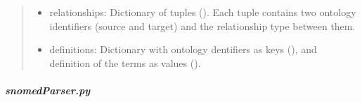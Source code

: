 \documentclass[letterpaper,10pt,english]{sphinxmanual}
\begin{document}
\begin{fulllineitems}
\begin{quote}
\begin{description}
\begin{itemize}
\item {} 
relationships: Dictionary of tuples (). Each tuple contains two ontology identifiers (source and target) and                         the relationship type between them.

\item {} 
definitions: Dictionary with ontology dentifiers as keys (), and definition of the terms as values ().

\end{itemize}


\end{description}\end{quote}

\end{fulllineitems}



\subparagraph{snomedParser.py}
\label{\detokenize{_autosummary/graphdb_builder.ontologies.parsers:module-graphdb_builder.ontologies.parsers.snomedParser}}\label{\detokenize{_autosummary/graphdb_builder.ontologies.parsers:snomedparser-py}}
\end{document}
